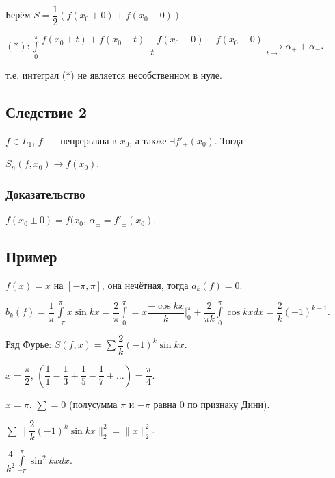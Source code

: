 \documentclass{article}
\begin{document}
            Берём $S = \dfrac{1}{2} \left( f(x_0 + 0) + f(x_0 - 0) \right)$.
            
            $(*) : \int\limits^{\pi}_0 \dfrac{f(x_0 + t) + f(x_0 - t) - f(x_0 + 0) - f(x_0 - 0)}{t} \xrightarrow[t \rightarrow 0]{} \alpha_+ + \alpha_-$.
            
            т.е. интеграл (*) не является несобственном в нуле.
            
        \subsection{Следствие 2}
        
            $f \in L_1$, $f$~--- непрерывна в $x_0$, а также $\exists f'_{\pm} (x_0)$. Тогда
            
            $S_n(f, x_0) \rightarrow f(x_0)$.
            
            \subsubsection{Доказательство}
            
                $f(x_0 \pm 0) = f(x_0$, $\alpha_{\pm} = f'_{\pm} (x_0)$.
                
        \subsection{Пример}
        
            $f(x) = x$ на $[-\pi, \pi]$, она нечётная, тогда $a_k(f) = 0$.
            
            $b_k(f) = \dfrac{1}{\pi} \int\limits^{\pi}_{-\pi} x \sin {kx} = \dfrac{2}{\pi} \int\limits^{\pi}_0 = x \dfrac{-\cos{kx}}{k} \bigg|^{\pi}_0 + \dfrac{2}{\pi k} \int\limits^{\pi}_0 \cos {kx} dx = \dfrac{2}{k} (-1)^{k - 1}$.
            
            Ряд Фурье: $S(f, x) = \sum \dfrac{2}{k} (-1)^k \sin {kx}$.
            
            $x = \dfrac{\pi}{2}$, $\left( \dfrac{1}{1} - \dfrac{1}{3} + \dfrac{1}{5} - \dfrac{1}{7} + \ldots \right) = \dfrac{\pi}{4}$.
            
            $x = \pi$, $\sum = 0$ (полусумма $\pi$ и $-\pi$ равна $0$ по признаку Дини).
            
            $\sum \| \dfrac{2}{k} (-1)^k \sin {kx} \|^2_2 = \| x \|^2_2$.
            
            $\dfrac{4}{k^2} \int\limits^{\pi}_{-\pi} \sin^2 kx dx$.
            
\end{document}
